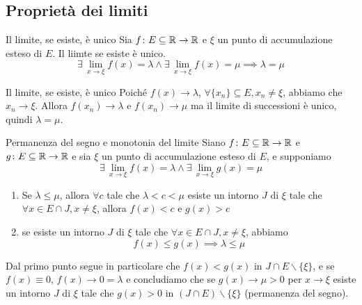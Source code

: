 \documentclass[a4paper]{article}
\begin{document}
\subsection{Proprietà dei limiti}

\begin{radioactive}
\begin{snippetproposition}{Il limite, se esiste, è unico}
    Sia \(f\colon E \subseteq \mathbb{R} \to \mathbb{R}\)
    e \(\xi\) un punto di accumulazione esteso di \(E\).
    Il liimte se esiste è unico.
    \[
        \exists\, \lim_{x\to\xi} f(x) = \lambda
        \land
        \exists\, \lim_{x\to\xi} f(x) = \mu
        \implies \lambda = \mu
    \]
\end{snippetproposition}

\begin{snippetproof}{Il limite, se esiste, è unico}
    Poiché \(f(x) \to \lambda\), \(\forall \{x_n\} \subseteq E, x_n \neq \xi\),
    abbiamo che \(x_n \to \xi\). Allora \(f(x_n) \to \lambda\)
    e \(f(x_n) \to \mu\) ma il limite di successioni è unico, quindi \(\lambda = \mu\).
\end{snippetproof}
\end{radioactive}

\begin{snippetproposition}{Permanenza del segno e monotonia del limite}
    Siano \(f\colon E \subseteq \mathbb{R} \to \mathbb{R}\)
    e \(g\colon E \subseteq \mathbb{R} \to \mathbb{R}\)
    e sia \(\xi\) un punto di accumulazione esteso di \(E\), e supponiamo
    \[
        \exists\,\lim_{x\to \xi} f(x) = \lambda
        \land
        \exists\,\lim_{x\to \xi} g(x) = \mu
    \]
    \begin{enumerate}
        \item Se \(\lambda \leq \mu\), allora \(\forall c\) tale che \(\lambda < c < \mu\)
        esiste un intorno \(J\) di \(\xi\) tale che \(\forall x \in E \cap J, x \neq \xi\),
        allora \(f(x) < c\) e \(g(x)>c\)
        \item se esiste un intorno \(J\) di \(\xi\) tale che
        \(\forall x \in E \cap J, x \neq \xi\), abbiamo
        \[
            f(x) \leq g(x) \implies \lambda \leq \mu
        \]
    \end{enumerate}
\end{snippetproposition}

Dal primo punto segue in particolare che \(f(x) < g(x)\) in \(J \cap E \backslash \{\xi\}\),
e se \(f(x) \equiv 0\), \(f(x) \to 0 = \lambda\) e concludiamo che se \(g(x) \to \mu > 0\)
per \(x\to \xi\) esiste un intorno \(J\) di \(\xi\)
tale che \(g(x) > 0\) in \((J \cap E) \backslash \{\xi\}\) (permanenza del segno).
\end{document}
